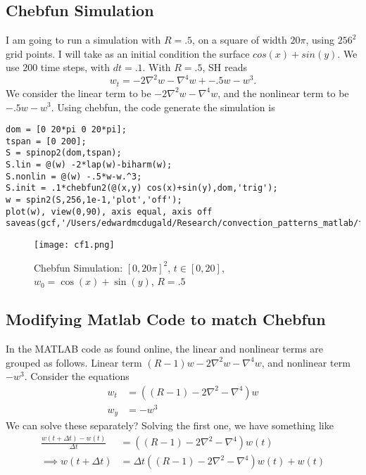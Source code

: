 \documentclass[12pt]{article}
\begin{document}
\subsection{Chebfun Simulation}
I am going to run a simulation with $R=.5$, on a square of width $20\pi$, using $256^2$ grid points. I will take as an initial condition the surface $cos(x)+sin(y)$. We use $200$ time steps, with $dt=.1$.
With $R=.5$, SH reads
\[
  w_t = -2\nabla^2w - \nabla^4w + -.5w - w^3.
\]
We consider the linear term to be $-2\nabla^2 w - \nabla^4w$, and the nonlinear term to be $-.5w-w^3$.
Using chebfun, the code generate the simulation is
\begin{verbatim}
dom = [0 20*pi 0 20*pi];
tspan = [0 200];
S = spinop2(dom,tspan);
S.lin = @(w) -2*lap(w)-biharm(w);
S.nonlin = @(w) -.5*w-w.^3;
S.init = .1*chebfun2(@(x,y) cos(x)+sin(y),dom,'trig');
w = spin2(S,256,1e-1,'plot','off');
plot(w), view(0,90), axis equal, axis off
saveas(gcf,'/Users/edwardmcdugald/Research/convection_patterns_matlab/figs/cf1.png');
\end{verbatim}
\begin{figure}[ht]
        \centering
        \texttt{[image: cf1.png]}
        \caption{Chebfun Simulation: $[0,20\pi]^2$, $t \in [0,20]$, $w_0=\cos(x)+\sin(y)$, $R=.5$}
\end{figure}
\subsection{Modifying Matlab Code to match Chebfun}
In the MATLAB code as found online, the linear and nonlinear terms are grouped as follows.
Linear term $(R-1)w-2\nabla^2 w - \nabla^4w$, and nonlinear term $-w^3$.
Consider the equations
\begin{align*}
    w_t &= \left( (R-1) -2\nabla^2 - \nabla^4 \right)w\\
    w_y &= -w^3
\end{align*}
We can solve these separately?
Solving the first one, we have something like
\begin{align*}
    \frac{w(t+\Delta t)-w(t)}{\Delta t} &= \left( (R-1) -2\nabla^2 -\nabla^4\right)w(t)\\
    \implies w(t+\Delta t) &= \Delta t \left((R-1) -2\nabla^2 -\nabla^4 \right)w(t) + w(t)
\end{align*}
\end{document}
